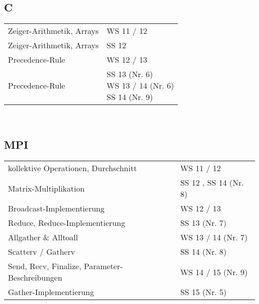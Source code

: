 \subsection{C}
\begin{table}[h]
\centering
\label{my-label}
\begin{tabular}{ll}
	Zeiger-Arithmetik, Arrays
	& WS 11 / 12  \\
	
	Zeiger-Arithmetik, Arrays
	& SS 12 \\
	
	Precedence-Rule
	& WS 12 / 13 \\
	
	Precedence-Rule
	& \multlineTable{SS 13 (Nr. 6)\\ WS 13 / 14 (Nr. 6)\\ SS 14 (Nr. 9) } \\	
\end{tabular}
\end{table}
~\\

\subsection{MPI}
\begin{table}[h]
	\centering
	\label{my-label}
	\begin{tabular}{ll}
		kollektive Operationen, Durchschnitt
		& WS 11 / 12  \open\\
		
		Matrix-Multiplikation
		& SS 12 \open, SS 14 (Nr. 8) \\
		
		Broadcast-Implementierung
		& WS 12 / 13 \open \\
		
		Reduce, Reduce-Implementierung 
		& SS 13 (Nr. 7)\\
		
		Allgather \& Alltoall 
		& WS 13 / 14 (Nr. 7) \\	
		
		Scatterv / Gatherv
		& SS 14 (Nr. 8) \\		
		
		Send, Recv, Finalize, Parameter-Beschreibungen
		& WS 14 / 15 (Nr. 9) \\	
		
		Gather-Implementierung
		& SS 15 (Nr. 5) \\
	\end{tabular}
\end{table}
~\\

